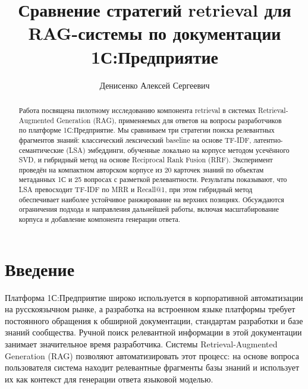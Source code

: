 \documentclass[nonacm, sigconf]{acmart}
\begin{document}
\title{Сравнение стратегий retrieval для RAG-системы по документации 1С:Предприятие}

\author{Денисенко Алексей Сергеевич}

\begin{abstract}
Работа посвящена пилотному исследованию компонента retrieval в системах Retrieval-Augmented Generation (RAG), применяемых для ответов на вопросы разработчиков по платформе 1С:Предприятие. Мы сравниваем три стратегии поиска релевантных фрагментов знаний: классический лексический baseline на основе TF-IDF, латентно-семантические (LSA) эмбеддинги, обученные локально на корпусе методом усечённого SVD, и гибридный метод на основе Reciprocal Rank Fusion (RRF). Эксперимент проведён на компактном авторском корпусе из 20 карточек знаний по объектам метаданных 1С и 25 вопросах с разметкой релевантности. Результаты показывают, что LSA превосходит TF-IDF по MRR и Recall@1, при этом гибридный метод обеспечивает наиболее устойчивое ранжирование на верхних позициях. Обсуждаются ограничения подхода и направления дальнейшей работы, включая масштабирование корпуса и добавление компонента генерации ответа.
\end{abstract}


\maketitle

\section{Введение}

Платформа 1С:Предприятие широко используется в корпоративной автоматизации на русскоязычном рынке, а разработка на встроенном языке платформы требует постоянного обращения к обширной документации, стандартам разработки и базе знаний сообщества. Ручной поиск релевантной информации в этой документации занимает значительное время разработчика. Системы Retrieval-Augmented Generation (RAG) позволяют автоматизировать этот процесс: на основе вопроса пользователя система находит релевантные фрагменты базы знаний и использует их как контекст для генерации ответа языковой моделью.
\end{document}
